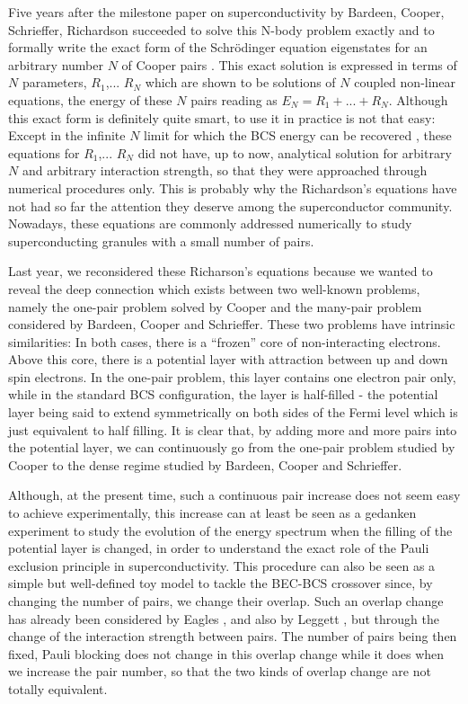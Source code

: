 \documentclass[aps,prb,superscriptaddress,showpacs,reprint,lengthcheck]{revtex4-1}
\begin{document}
Five years after the milestone paper on superconductivity by Bardeen,
Cooper, Schrieffer\cite{BCS}, Richardson succeeded to solve this N-body problem exactly and to formally write
the exact form of the Schr\"{o}dinger equation eigenstates for an arbitrary number $N$ of Cooper pairs%
\cite{Richardson1,Richardson2}. This exact solution is expressed in terms
of $N$ parameters, $R_{1}$,... $R_{N}$ which are shown to be solutions of $N$ coupled
non-linear equations, the energy of these $N$ pairs reading as $E
_{N}=R_{1}+...+R_{N}$. Although this exact form is definitely quite smart, to
use it in practice is not that easy: Except in the infinite $N$ limit for which the BCS energy can be recovered \cite{Richardson3}, these equations for $R_{1}$,... $R_{N}$  did not have, up to now, analytical solution for arbitrary $N$ and arbitrary interaction strength, so that they were approached through
numerical procedures\cite{Duk,delft} only. This is probably why the Richardson's equations have not had so far the
attention they deserve among the superconductor community. Nowadays, these equations 
are commonly addressed numerically to study superconducting granules with a small number of pairs\cite{Duk}.

Last year, we reconsidered these Richarson's equations because we wanted to reveal the deep connection which exists between two well-known problems, namely the
one-pair problem solved by Cooper and the many-pair problem considered by Bardeen, Cooper and Schrieffer. 
These two problems have intrinsic similarities: In
both cases, there is a ``frozen'' core of non-interacting electrons. Above this core, there is
a potential layer with attraction between up and
down spin electrons. In the one-pair problem, this layer contains one electron pair 
only, while in the standard BCS configuration, the
layer is half-filled - the potential layer being said to extend symmetrically 
on both sides of the Fermi level which is just equivalent to half filling.
It is clear that, by adding more and more pairs into the potential layer, we can 
continuously go from the one-pair problem studied by Cooper to the dense regime studied by Bardeen, Cooper and Schrieffer. 

Although, at the present time, such a continuous pair increase
does not seem easy to achieve experimentally, this increase can at least be seen as a 
gedanken experiment to study the evolution of the energy spectrum when
the filling of the potential layer is changed, in order to understand the exact role of the Pauli
exclusion principle in superconductivity. 
This procedure can also be
seen as a simple but well-defined toy model to tackle the BEC-BCS crossover
since, by changing the number of pairs, we change their overlap. 
Such an overlap change has already been considered by Eagles \cite{Eagle}, 
and also by Leggett \cite{LeggettCrossover}, but through the change of the interaction strength between pairs. The number of pairs being then fixed, Pauli blocking does not change in this overlap change while it does when we increase the pair number, so that the two kinds of overlap change are not totally equivalent.
\end{document}
